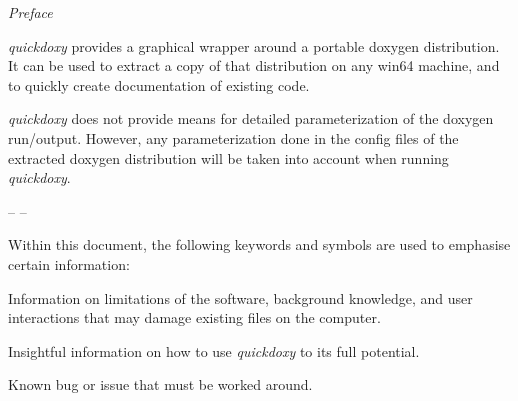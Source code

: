 \thispagestyle{empty}
\begin{flushleft}
\emph{Preface}
\end{flushleft}


\textit{quickdoxy} provides a graphical wrapper around a portable doxygen distribution. It can be used to extract a copy of that 
distribution on any win64 machine, and to quickly create documentation of existing code. 

\textit{quickdoxy} does not provide means for detailed parameterization of the doxygen run/output. However, any parameterization
done in the config files of the extracted doxygen distribution will be taken into account when running \textit{quickdoxy}.
\begin{flushleft}

-- --

\end{flushleft}

\noindent Within this document, the following keywords and symbols are used to \mbox{emphasise} certain information:
\begin{IMPORTANT}
Information on limitations of the software, background knowledge, and user interactions that may damage existing files on the computer.
\end{IMPORTANT}
\begin{USEFUL}
Insightful information on how to use \textit{quickdoxy} to its full potential.
\end{USEFUL}		
\begin{BUG}
Known bug or issue that must be worked around.
\end{BUG}			
\addtocounter{page}{-1}
\newpage	

